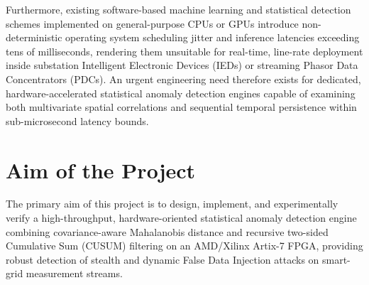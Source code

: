 \documentclass[11pt,a4paper]{report}
\begin{document}
Furthermore, existing software-based machine learning and statistical detection
schemes implemented on general-purpose CPUs or GPUs introduce non-deterministic
operating system scheduling jitter and inference latencies exceeding tens of
milliseconds, rendering them unsuitable for real-time, line-rate deployment inside
substation Intelligent Electronic Devices (IEDs) or streaming Phasor Data Concentrators
(PDCs). An urgent engineering need therefore exists for dedicated, hardware-accelerated
statistical anomaly detection engines capable of examining both multivariate spatial
correlations and sequential temporal persistence within sub-microsecond latency bounds.

\section{Aim of the Project}
The primary aim of this project is to design, implement, and experimentally verify
a high-throughput, hardware-oriented statistical anomaly detection engine combining
covariance-aware Mahalanobis distance and recursive two-sided Cumulative Sum (CUSUM)
filtering on an AMD/Xilinx Artix-7 FPGA, providing robust detection of stealth and
dynamic False Data Injection attacks on smart-grid measurement streams.
\end{document}
